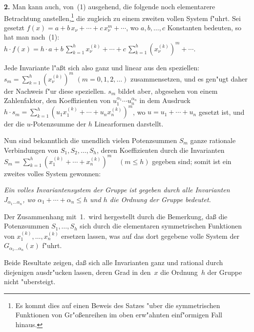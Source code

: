 \documentclass[11pt,a4paper]{article}
\begin{document}
\smallskip
\noindent
\textbf{2.} Man kann auch, von~(1) ausgehend, die folgende noch elementarere
Betrachtung anstellen,\footnote{Es kommt dies auf einen Beweis des Satzes
"{u}ber die symmetrischen Funktionen von Gr"{o}\ss{}enreihen im oben erw"{a}hnten
einf"{o}rmigen Fall hinaus.} die zugleich zu einem zweiten vollen System
f"{u}hrt. Sei gesetzt
$f(x)=a+b\,x_{\nu}+\cdots+c\,x_{\nu}^{m}+\cdots$,
wo $a,b,\dots,c$ Konstanten bedeuten, so hat man nach~(1):
$h\cdot f(x)=h\cdot a+b\,\sum_{k=1}^{h}x_{\nu}^{(k)}+\cdots+c\,\sum_{k=1}^{h}(x_{\nu}^{(k)})^{m}+\cdots$.

Jede Invariante l"{a}\ss{}t sich also ganz und linear aus den speziellen:
$s_{m}=\sum_{k=1}^{h}(x_{\nu}^{(k)})^{m}$
$(m=0,1,2,\dots)$
zusammensetzen, und es gen"{u}gt daher der Nachweis f"{u}r diese speziellen.
$s_{m}$ bildet aber, abgesehen von einem Zahlenfaktor, den Koeffizienten
von $u_{1}^{\alpha_{1}}\cdots u_{n}^{\alpha_{n}}$ in dem Ausdruck
$h\cdot s_{m}=\sum_{k=1}^{h}(u_{1}x_{1}^{(k)}+\cdots+u_{n}x_{n}^{(k)})^{m}$,
wo $u=u_{1}+\cdots+u_{n}$ gesetzt ist, und der die $u$-Potenzsumme der $h$
Linearformen darstellt.

Nun sind bekanntlich die unendlich vielen Potenzsummen $S_{m}$ ganze
rationale Verbindungen von $S_{1},S_{2},\dots,S_{h}$, deren Koeffizienten
durch die Invarianten
$S_{m}=\sum_{k=1}^{h}(x_{1}^{(k)}+\cdots+x_{n}^{(k)})^{m}\quad(m\le h)$
gegeben sind; somit ist ein zweites volles System gewonnen:

\smallskip
\emph{Ein volles Invariantensystem der Gruppe ist gegeben durch alle
Invarianten $J_{\alpha_{1}\dots\alpha_{n}}$, wo $\alpha_{1}+\cdots+\alpha_{n}\le h$ und $h$ die Ordnung
der Gruppe bedeutet.}

Der Zusammenhang mit~1.\ wird hergestellt durch die Bemerkung,
da\ss{} die Potenzsummen $S_{1},\dots,S_{h}$ sich durch die elementaren symmetrischen
Funktionen von $x_{1}^{(k)},\dots,x_{n}^{(k)}$ ersetzen lassen, was auf das dort
gegebene volle System der $G_{\alpha_{1}\dots\alpha_{n}}(x)$ f"{u}hrt.

Beide Resultate zeigen, da\ss{} sich alle Invarianten ganz und rational
durch diejenigen ausdr"{u}cken lassen, deren Grad in den~$x$ die Ordnung~$h$
der Gruppe nicht "{u}bersteigt.
\end{document}
